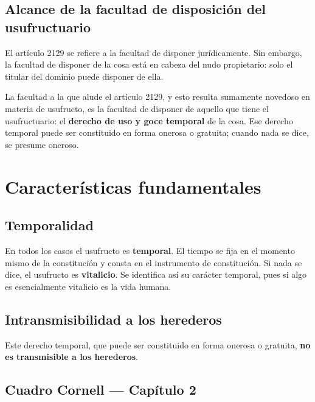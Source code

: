 \documentclass[12pt,oneside]{book}
\begin{document}
\subsection{Alcance de la facultad de disposición del usufructuario}

El artículo 2129 se refiere a la facultad de disponer jurídicamente. Sin embargo, la facultad de disponer de la cosa está en cabeza del nudo propietario: solo el titular del dominio puede disponer de ella.

La facultad a la que alude el artículo 2129, y esto resulta sumamente novedoso en materia de usufructo, es la facultad de disponer de aquello que tiene el usufructuario: el \textbf{derecho de uso y goce temporal} de la cosa. Ese derecho temporal puede ser constituido en forma onerosa o gratuita; cuando nada se dice, se presume oneroso.

\section{Características fundamentales}

\subsection{Temporalidad}

En todos los casos el usufructo es \textbf{temporal}. El tiempo se fija en el momento mismo de la constitución y consta en el instrumento de constitución. Si nada se dice, el usufructo es \textbf{vitalicio}. Se identifica así su carácter temporal, pues si algo es esencialmente vitalicio es la vida humana.

\subsection{Intransmisibilidad a los herederos}

Este derecho temporal, que puede ser constituido en forma onerosa o gratuita, \textbf{no es transmisible a los herederos}.

\subsection*{Cuadro Cornell --- Capítulo 2}
\end{document}
